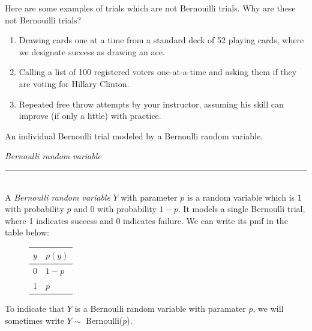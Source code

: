 \documentclass[12pt]{article}
\theoremstyle{definition}
\theoremstyle{remark}
\begin{document}
Here are some examples of trials which are not Bernouilli trials. Why are these not Bernouilli trials?
\begin{enumerate}
\item Drawing cards one at a time from a standard deck of 52 playing cards, where we designate success as drawing an ace.
\item Calling a list of 100 registered voters one-at-a-time and asking them if they are voting for Hillary Clinton.
\item Repeated free throw attempts by your instructor, assuming his skill can improve (if only a little) with practice.
\end{enumerate}

An individual Bernoulli trial modeled by a Bernoulli random variable.

\begin{framed}
  \emph{Bernoulli random variable}\\
  \rule{\dimexpr{}\fboxrule}{.1pt} \\
A \emph{Bernoulli random variable} $Y$ with parameter $p$ is a random variable which is 1 with probability $p$ and 0 with probability $1 - p$. It models a single Bernoulli trial, where 1 indicates success and 0 indicates failure. We can write its pmf in the table below:
\begin{figure}[H]
\centering
\begin{tabular}{l@{\hskip 2cm}l}
\toprule
$y$ & $p(y)$\\
\midrule
0 & $1 - p$\\
1 & $p$ \\
\bottomrule
\end{tabular}
\end{figure}
To indicate that $Y$ is a Bernoulli random variable with paramater $p$, we will sometimes write $Y \sim$ Bernoulli($p$).
\end{framed}
\end{document}

